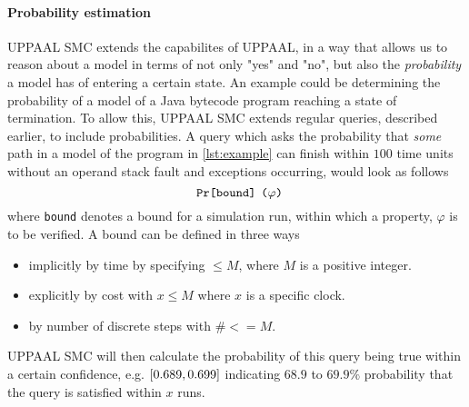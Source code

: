 \paragraph{Probability estimation}
UPPAAL SMC extends the capabilites of UPPAAL, in a way that allows us to reason about a model in terms of not only "yes" and "no", but also the \textit{probability} a model has of entering a certain state. An example could be determining the probability of a model of a Java bytecode program reaching a state of termination. To allow this, UPPAAL SMC extends regular queries, described earlier, to include probabilities. A query which asks the probability that \textit{some} path in a model of the program in \cref{lst:example} can finish within $100$ time units without an operand stack fault and exceptions occurring, would look as follows\\
$$\texttt{Pr\relax[bound\relax] ($\varphi$)}$$
where \texttt{bound} denotes a bound for a simulation run, within which a property, $\varphi$ is to be verified. A bound can be defined in three ways~\cite[p. 402]{smc}

\begin{itemize}
\item implicitly by time by specifying $\leq M$, where $M$ is a positive integer.
\item explicitly by cost with $x \leq M$ where $x$ is a specific clock.
\item by number of discrete steps with $\# <= M$. 
\end{itemize}

UPPAAL SMC will then calculate the probability of this query being true within a certain confidence, e.g. $\relax[0.689, 0.699]$ indicating $68.9$ to $69.9\%$ probability that the query is satisfied within $x$ runs.
